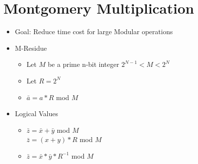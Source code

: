 \section{Montgomery Multiplication}
\begin{itemize}
\item Goal: Reduce time cost for large Modular operations
\item M-Residue
    \begin{itemize}
    \item Let $M$ be a prime n-bit integer $2^{N-1} < M < 2^N$
    \item Let $R = 2^N$
    \item $\bar{a} = a*R$ mod $M$
    \end{itemize}
\item Logical Values
    \begin{itemize}
    \item $\bar{z} = \bar{x} + \bar{y}$ mod $M$
        \\$\bar{z} = (x+y)*R$ mod $M$
    \item $\bar{z} = \bar{x}*\bar{y}*R^{-1}$ mod $M$
    \end{itemize}
\end{itemize}